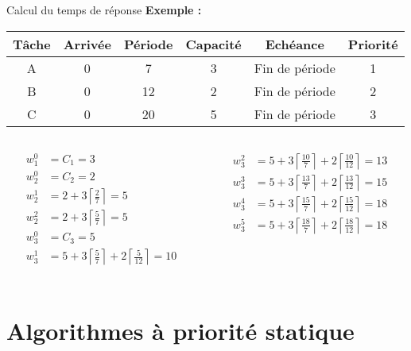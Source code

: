 \begin{frame}{Calcul du temps de réponse}
  \textbf{Exemple :}
  \begin{center}
    \begin{tabular}{cccccc}
      \hline
      Tâche & Arrivée & Période & Capacité & Echéance & Priorité \\
      \hline
      A & 0 &  7 & 3 & Fin de période & 1\\
      B & 0 & 12 & 2 & Fin de période & 2\\
      C & 0 & 20 & 5 & Fin de période & 3\\
      \hline
    \end{tabular}
  \end{center}
  \begin{columns}
    \begin{column}{5cm}
      \begin{align*}
        w_1^0 &= C_1 = 3\\
        w_2^0 &= C_2 = 2\\
        w_2^1 &= 2 + 3 \left\lceil\frac{2}{7}\right\rceil = 5\\
        w_2^2 &= 2 + 3 \left\lceil\frac{5}{7}\right\rceil = 5\\
        w_3^0 &= C_3 = 5\\
        w_3^1 &= 5 + 3 \left\lceil\frac{5}{7}\right\rceil + 2 \left\lceil\frac{5}{12}\right\rceil = 10\\
      \end{align*} 
    \end{column}
    \begin{column}{5cm}
      \begin{align*}
        w_3^2 &= 5 + 3 \left\lceil\frac{10}{7}\right\rceil + 2 \left\lceil\frac{10}{12}\right\rceil = 13\\
        w_3^3 &= 5 + 3 \left\lceil\frac{13}{7}\right\rceil + 2 \left\lceil\frac{13}{12}\right\rceil = 15\\
        w_3^4 &= 5 + 3 \left\lceil\frac{15}{7}\right\rceil + 2 \left\lceil\frac{15}{12}\right\rceil = 18\\
        w_3^5 &= 5 + 3 \left\lceil\frac{18}{7}\right\rceil + 2 \left\lceil\frac{18}{12}\right\rceil = 18\\
      \end{align*} 
    \end{column}
  \end{columns}
\end{frame}

\section{Algorithmes à priorité statique}

